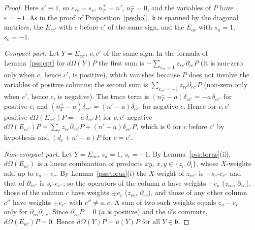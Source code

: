 \documentclass[10pt]{amsart}
\theoremstyle{definition}
\theoremstyle{remark}
\begin{document}
\begin{proof}
Here $s'\equiv1$, so $\varepsilon_{rc}=s_c$, $n_T^+=n'$, $n_T^-=0$, and the variables of $P$ have $\varepsilon=-1$.
As in the proof of Proposition~\ref{pss:hol}, $\mathfrak b$ is spanned by the diagonal matrices, the
$E_{cc'}$ with $c$ before $c'$ of the same sign, and the $E_{ac}$ with $s_a=1$, $s_c=-1$.

\emph{Compact part.} Let $Y=E_{cc'}$, $c,c'$ of the same sign. In the formula of
Lemma~\ref{pss:cpt} for $d\Omega(Y)P$ the first sum is $-\sum_{\varepsilon_{rc}=1}z_{rc'}\partial_{rc}P$ (it is
non-zero only when $c$, hence $c'$, is positive), which vanishes because $P$ does not involve the
variables of positive columns; the second sum is $\sum_{\varepsilon_{rc'}=-1}z_{rc}\partial_{rc'}P$ (non-zero only
when $c'$, hence $c$, is negative). The trace term is $(n_T^--a)\delta_{cc'}=-a\,\delta_{cc'}$ for positive
$c$, and $(n_T^+-a)\delta_{cc'}=(n'-a)\delta_{cc'}$ for negative $c$. Hence for $c,c'$ positive
$d\Omega(E_{cc'})P=-a\,\delta_{cc'}P$; for $c,c'$ negative $d\Omega(E_{cc'})P=\sum_rz_{rc}\partial_{rc'}P+(n'-a)
\delta_{cc'}P$, which is $0$ for $c$ before $c'$ by hypothesis and $(d_c+n'-a)P$ for $c=c'$.

\emph{Non-compact part.} Let $Y=E_{ac}$, $s_a=1$, $s_c=-1$. By Lemma~\ref{pss:torus}(ii),
$d\Omega(E_{ac})$ is a linear combination of products $xy$, $x,y\in\{z_i,\partial_i\}$, whose $X$-weights add
up to $e_a-e_c$. By Lemma~\ref{pss:torus}(i) the $X$-weight of $z_{rc''}$ is $-s_{c''}e_{c''}$ and that of
$\partial_{rc''}$ is $s_{c''}e_{c''}$; so the operators of the column $a$ have weights $\mp e_a$ ($z_{ra}$,
$\partial_{ra}$), those of the column $c$ have weights $\pm e_c$ ($z_{rc}$, $\partial_{rc}$), and those of any other
column $c''$ have weights $\pm e_{c''}$ with $c''\ne a,c$. A sum of two such weights equals $e_a-e_c$ only
for $\partial_{ra}\partial_{r'c}$. Since $\partial_{ra}P=0$ ($a$ is positive) and the $\partial$'s commute,
$d\Omega(E_{ac})P=0$. Hence $d\Omega(Y)P=u(Y)P$ for all $Y\in\mathfrak b$.
\end{proof}
\end{document}
